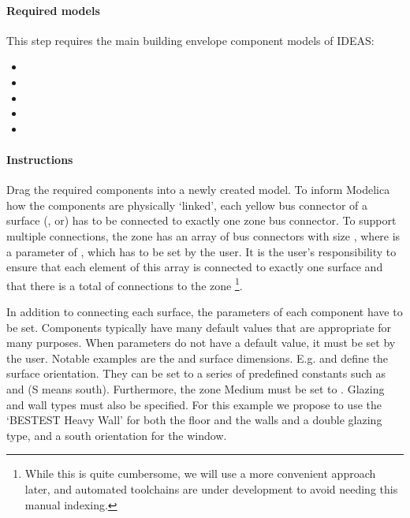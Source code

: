 \documentclass[10pt,a4paper]{article}
\begin{document}
\paragraph{Required models}
This step requires the main building envelope component models of IDEAS:
\begin{itemize}
\item {}
\item {}
\item {}
\item {}
\item {}
\end{itemize}

\paragraph{Instructions}
Drag the required components into a newly created model. To inform Modelica how the components are physically `linked', each yellow bus connector of a surface (,  or) has to be connected to exactly one zone bus connector.
To support multiple connections, the zone has an array of bus connectors with size , where  is a parameter of , which has to be set by the user. It is the user's responsibility to ensure that each element of this array is connected to exactly one surface and that there is a total of  connections to the zone \footnote{While this is quite cumbersome, we will use a more convenient approach later, and automated toolchains are under development to avoid needing this manual indexing.}.

In addition to connecting each surface, the parameters of each component have to be set. 
Components typically have many default values that are appropriate for many purposes.
When parameters do not have a default value, it must be set by the user. 
Notable examples are the  and surface dimensions. 
E.g.  and  define the surface orientation.
They can be set to a series of predefined constants such as 
and  (S means south).
Furthermore, the zone Medium must be set to .
Glazing and wall types must also be specified.
For this example we propose to use the `BESTEST Heavy Wall' for both the floor and the walls
and a double glazing type, and a south orientation for the window. 
\end{document}

